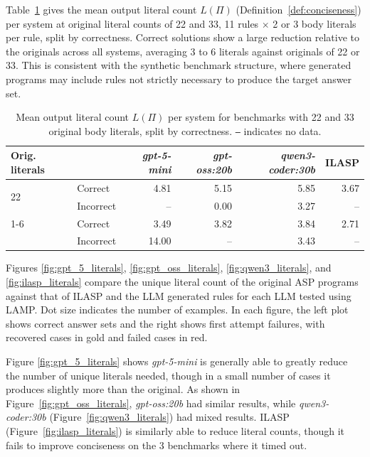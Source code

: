 \documentclass[11pt,a4paper]{article}
\begin{document}
Table~\ref{tab:lit_by_correctness} gives the mean output literal count $L(\Pi)$ (Definition~\ref{def:conciseness}) per system at original literal counts of 22 and 33, 11 rules $\times$ 2 or 3 body literals per rule, split by correctness. Correct solutions show a large reduction relative to the originals across all systems, averaging 3 to 6 literals against originals of 22 or 33. This is consistent with the synthetic benchmark structure, where generated programs may include rules not strictly necessary to produce the target answer set.

\begin{table}[htbp]
\centering
\caption{Mean output literal count $L(\Pi)$ per system for benchmarks with 22 and 33 original body literals, split by correctness. \texttt{--} indicates no data.}
\label{tab:lit_by_correctness}
\begin{tabular}{llrrrr}
\toprule
Orig. literals & & \textit{gpt-5-mini} & \textit{gpt-oss:20b} & \textit{qwen3-coder:30b} & ILASP \\
\midrule
\multirow{2}{*}{22} & Correct   & 4.81 & 5.15 & 5.85 & 3.67 \\
                    & Incorrect & --   & 0.00 & 3.27 & --   \\
\cmidrule(lr){1-6}
\multirow{2}{*}{33} & Correct   & 3.49 & 3.82 & 3.84 & 2.71 \\
                    & Incorrect & 14.00 & --   & 3.43 & --   \\
\bottomrule
\end{tabular}
\end{table}

Figures \ref{fig:gpt_5_literals}, \ref{fig:gpt_oss_literals}, \ref{fig:qwen3_literals}, and \ref{fig:ilasp_literals} compare the unique literal count of the original ASP programs against that of ILASP and the LLM generated rules for each LLM tested using LAMP. Dot size indicates the number of examples. In each figure, the left plot shows correct answer sets and the right shows first attempt failures, with recovered cases in gold and failed cases in red.

Figure \ref{fig:gpt_5_literals} shows \textit{gpt-5-mini} is generally able to greatly reduce the number of unique literals needed, though in a small number of cases it produces slightly more than the original. As shown in Figure~\ref{fig:gpt_oss_literals}, \textit{gpt-oss:20b} had similar results, while \textit{qwen3-coder:30b} (Figure~\ref{fig:qwen3_literals}) had mixed results. ILASP (Figure~\ref{fig:ilasp_literals}) is similarly able to reduce literal counts, though it fails to improve conciseness on the 3 benchmarks where it timed out.
\end{document}
